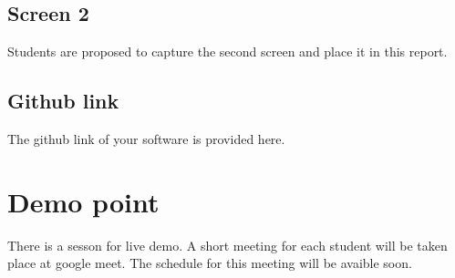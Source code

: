\documentclass[a4paper,11pt]{article}
\theoremstyle{mytheor}
\begin{document}
\subsection{Screen 2}
Students are proposed to capture the second screen and place it in this report.

\subsection{Github link}
The github link of your software is provided here.

\section{Demo point}
There is a sesson for live demo. A short meeting for each student will be taken place at google meet. The schedule for this meeting will be avaible soon. 
\end{document}
